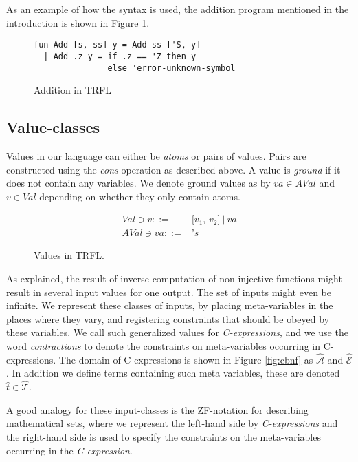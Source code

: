 \documentclass[10pt]{../sigplanconf}
\begin{document}
As an example of how the syntax is used, the addition program
mentioned in the introduction is shown in Figure \ref{fig:addprog}.

\begin{figure}
  \centering
\begin{verbatim}
fun Add [s, ss] y = Add ss ['S, y]
  | Add .z y = if .z == 'Z then y
               else 'error-unknown-symbol
\end{verbatim}
  \caption{Addition in TRFL}
  \label{fig:addprog}
\end{figure}


\subsection{Value-classes}
Values in our language can either be \textit{atoms} or pairs of
values. Pairs are constructed using the \textit{cons}-operation as
described above. A value is \textit{ground} if it does not contain any
variables. We denote ground values as by $va \in AVal$ and $v \in Val$
depending on whether they only contain atoms.

\begin{figure}\centering
  \begin{align*}
    Val \ni v ::= & \texttt{[$v_1$, $v_2$]}\ |\ va\\
    AVal \ni va ::= & \texttt{'}s
  \end{align*}
  \caption{Values in TRFL.}
\label{fig:vbnf}
\end{figure}

As explained, the result of inverse-computation of non-injective
functions might result in several input values for one output. The set
of inputs might even be infinite. We represent these classes of
inputs, by placing meta-variables in the places where they vary, and
registering constraints that should be obeyed by these variables.  We
call such generalized values for \textit{C-expressions}, and we use
the word \textit{contractions} to denote the constraints on
meta-variables occurring in C-expressions. The domain of
C-expressions is shown in Figure \ref{fig:cbnf} as
$\mathcal{\widehat{A}}$ and $\mathcal{\widehat{E}}$. In addition we
define terms containing such meta variables, these are denoted
$\widehat{t} \in \widehat{\mathcal{T}}$.

A good analogy for these input-classes is the ZF-notation for
describing mathematical sets, where we represent the left-hand side by
\textit{C-expressions} and the right-hand side is used to specify the
constraints on the meta-variables occurring in the
\textit{C-expression}. 
\end{document}
